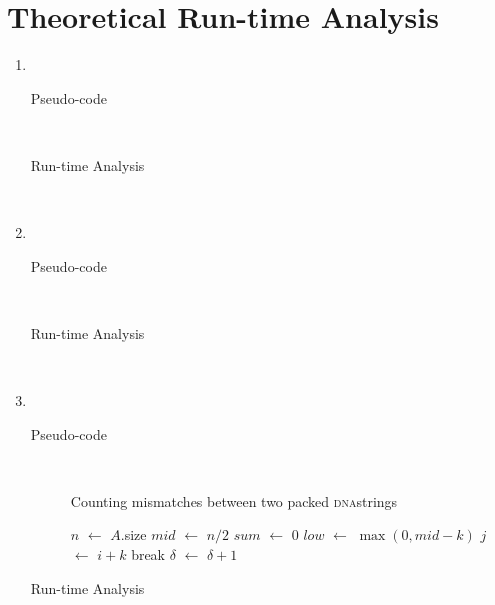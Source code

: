 \documentclass[paper=a4, fontsize=11pt]{scrartcl} %
\title{ 
    \normalfont \normalsize 
    \textsc{Oregon State University} \\ [25pt]
    \large Project Group #21
    \horrule{0.5pt} \\[0.4cm] %
    \huge \hwtitle \\ %
    \horrule{2pt} \\[0.5cm] %
}
\author{
    Colin Bradford
    \and
    Charles Jenkins
    \and
    Albert Le
} %
\date{\normalsize\today} %
\numberwithin{equation}{section} %
\numberwithin{figure}{section} %
\numberwithin{table}{section} %
\newcommand*\DNA{\textsc{dna}}
\newcommand*\Let[2]{\State #1 $\gets$ #2}
\begin{document}
\maketitle %


\section{Theoretical Run-time Analysis}
\begin{enumerate}[label=\bfseries Algorithm \arabic*:]
    \item \hfill \\
    \begin{description}
        \item[Pseudo-code] \hfill \\
        \item[Run-time Analysis] \hfill \\
    \end{description}

    \item \hfill \\
    \begin{description}
        \item[Pseudo-code] \hfill \\
        \item[Run-time Analysis] \hfill \\
    \end{description}

    \item \hfill \\
    \begin{description}
        \item[Pseudo-code] \hfill \\
        \begin{algorithm}
            \caption{Counting mismatches between two packed \DNA strings
            \label{alg:3}}
            \begin{algorithmic}[1]
              \Statex
                \Let{$n$}{$A$.size}
                \EndIf
                \Let{$mid$}{$n / 2$} \Comment{}
                \Let{$sum$}{$0$}
                \Let{$low$}{$\max{(0, mid - k)}$}
                  \Let{$j$}{$i + k$}
                    break
                  \EndIf
                \EndFor
                    \Let{$\delta$}{$\delta + 1$}
                  \EndIf
                \EndFor
                \State \Return{$\delta$}
              \EndFunction
            \end{algorithmic}
        \end{algorithm}
        \item[Run-time Analysis] \hfill \\
    \end{description}


\end{enumerate}
\end{document}
